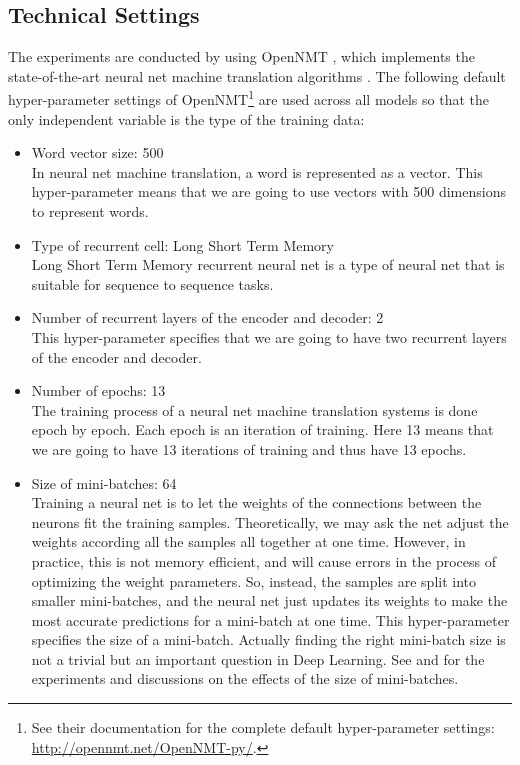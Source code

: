 \documentclass[final]{ua-thesis}
\numberwithin{equation}{section}
\begin{document}
\subsection{Technical Settings}
The experiments are conducted by using OpenNMT \citep{2017opennmt}, which implements the state-of-the-art neural net machine translation algorithms \citep{cho2014properties, cho2014learning, bahdanau2014neural}.
The following default hyper-parameter settings of OpenNMT\footnote{See their documentation for the complete default hyper-parameter settings: \url{http://opennmt.net/OpenNMT-py/}.} are used across all models so that the only independent variable is the type of the training data:
	\begin{itemize}
	\item Word vector size: 500\\
	In neural net machine translation, a word is represented as a vector. This hyper-parameter means that we are going to use vectors with 500 dimensions to represent words.
	\item Type of recurrent cell: Long Short Term Memory\\
	Long Short Term Memory recurrent neural net is a type of neural net that is suitable for sequence to sequence tasks.  
	\item Number of recurrent layers of the encoder and decoder: 2\\
	This hyper-parameter specifies that we are going to have two recurrent layers of the encoder and decoder. 
	\item Number of epochs: 13\\
	The training process of a neural net machine translation systems is done epoch by epoch. Each epoch is an iteration of training. Here 13 means that we are going to have 13 iterations of training and thus have 13 epochs. 
	\item Size of mini-batches: 64\\
	Training a neural net is to let the weights of the connections between the neurons fit the training samples. Theoretically, we may ask the net adjust the weights according all the samples all together at one time. However, in practice, this is not memory efficient, and will cause errors in the process of optimizing the weight parameters. So, instead, the samples are split into smaller mini-batches, and the neural net just updates its weights to make the most accurate predictions for a mini-batch at one time. This hyper-parameter specifies the size of a mini-batch. Actually finding the right mini-batch size is not a trivial but an important question in Deep Learning. See \citet{DBLP:journals/corr/KeskarMNST16} and \citet{DBLP:journals/corr/abs-1711-00489} for the experiments and discussions on the effects of the size of mini-batches. 
	\end{itemize}
\end{document}
